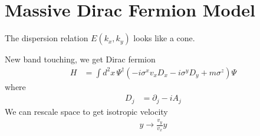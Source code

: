 \section{Massive Dirac Fermion Model}
The dispersion relation $E(k_x, k_y)$ looks like a cone.

New band touching,
we get Dirac fermion
\begin{align}
    H &=
    \int d^2 x\,
    \Psi^\dagger\left(
        -i\sigma^x v_x D_x
        - i\sigma^y D_y
        + m\sigma^z
    \right)\Psi
\end{align}
where
\begin{align}
    D_j &= \partial_j - i A_j
\end{align}
We can rescale space to get isotropic velocity
\begin{align}
    y \to \frac{v_y}{v_x}y
\end{align}

